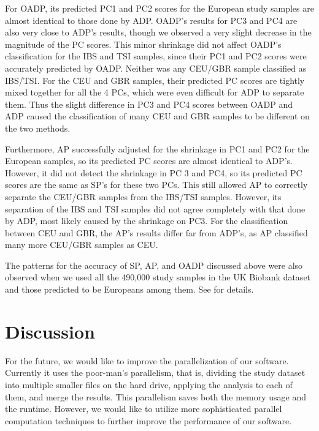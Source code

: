\documentclass{article}
\begin{document}
For OADP, its predicted PC1 and PC2 scores
for the European study samples
are almost identical
to those done by ADP.
OADP's results for PC3 and PC4
are also very close to ADP's results,
though we observed a very slight decrease in the magnitude of the PC scores.
This minor shrinkage did not affect
OADP's classification for the IBS and TSI samples,
since their PC1 and PC2 scores were accurately predicted by OADP.
Neither was any CEU/GBR sample classified as IBS/TSI. 
For the CEU and GBR samples,
their predicted PC scores are tightly mixed together
for all the 4 PCs,
which were even difficult for ADP to separate them.
Thus the slight difference in PC3 and PC4 scores
between OADP and ADP
caused the classification of many CEU and GBR samples
to be different on the two methods.

Furthermore, AP successfully adjusted for the shrinkage
in PC1 and PC2 for the European samples,
so its predicted PC scores are almost identical to ADP's.
However, it did not detect the shrinkage in PC 3 and PC4,
so its predicted PC scores are the same as SP's for these two PCs.
This still allowed AP to correctly separate
the CEU/GBR samples from the IBS/TSI samples.
However, its separation of the IBS and TSI samples
did not agree completely with that done by ADP,
most likely caused by the shrinkage on PC3.
For the classification between CEU and GBR,
the AP's results differ far from ADP's,
as AP classified many more CEU/GBR samples as CEU.

The patterns for the accuracy of SP, AP, and OADP
discussed above
were also observed
when we used all the 490,000 study samples in the UK Biobank dataset
and those predicted to be Europeans among them.
See  for details.


\section{Discussion}

For the future, we would like
to improve the parallelization of our software.
Currently it uses the poor-man’s parallelism,
that is,
dividing the study dataset into multiple smaller files on the hard drive,
applying the analysis to each of them,
and merge the results.
This parallelism saves both the memory usage and the runtime.
However, we would like to utilize
more sophisticated parallel computation techniques
to further improve the performance of our software.

\newpage

\appendix


\end{document}

